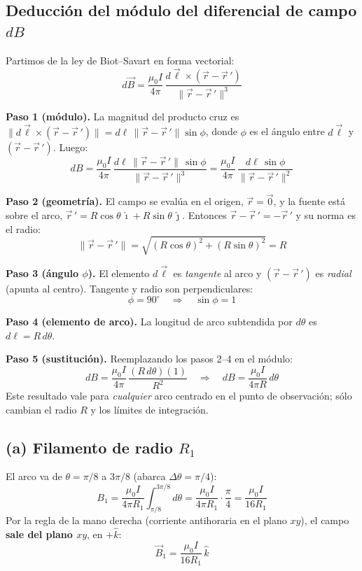 \documentclass[12pt,letterpaper]{article}
\begin{document}
\subsection*{Deducci\'on del m\'odulo del diferencial de campo $dB$}

Partimos de la ley de Biot--Savart en forma vectorial:
\[
    d\vec{B} = \frac{\mu_0 I}{4\pi}\,
    \frac{d\vec{\ell}\times(\vec{r}-\vec{r}\,')}{\|\vec{r}-\vec{r}\,'\|^{3}}
\]

\noindent\textbf{Paso 1 (m\'odulo).} La magnitud del producto cruz es
$\|d\vec{\ell}\times(\vec{r}-\vec{r}\,')\| = d\ell\,\|\vec{r}-\vec{r}\,'\|\sin\phi$, donde $\phi$ es el
\'angulo entre $d\vec{\ell}$ y $(\vec{r}-\vec{r}\,')$. Luego:
\[
    dB = \frac{\mu_0 I}{4\pi}\,
    \frac{d\ell\,\|\vec{r}-\vec{r}\,'\|\,\sin\phi}{\|\vec{r}-\vec{r}\,'\|^{3}}
    = \frac{\mu_0 I}{4\pi}\,\frac{d\ell\,\sin\phi}{\|\vec{r}-\vec{r}\,'\|^{2}}
\]

\noindent\textbf{Paso 2 (geometr\'ia).} El campo se eval\'ua en el origen, $\vec{r}=\vec{0}$, y la
fuente est\'a sobre el arco, $\vec{r}\,' = R\cos\theta\,\hat{\imath}+R\sin\theta\,\hat{\jmath}$.
Entonces $\vec{r}-\vec{r}\,'=-\vec{r}\,'$ y su norma es el radio:
\[
    \|\vec{r}-\vec{r}\,'\| = \sqrt{(R\cos\theta)^2+(R\sin\theta)^2} = R
\]

\noindent\textbf{Paso 3 (\'angulo $\phi$).} El elemento $d\vec{\ell}$ es \emph{tangente} al arco y
$(\vec{r}-\vec{r}\,')$ es \emph{radial} (apunta al centro). Tangente y radio son perpendiculares:
\[
    \phi = 90^\circ \quad\Rightarrow\quad \sin\phi = 1
\]

\noindent\textbf{Paso 4 (elemento de arco).} La longitud de arco subtendida por $d\theta$ es
$d\ell = R\,d\theta$.

\noindent\textbf{Paso 5 (sustituci\'on).} Reemplazando los pasos 2--4 en el m\'odulo:
\[
    dB = \frac{\mu_0 I}{4\pi}\,\frac{(R\,d\theta)(1)}{R^{2}}
    \quad\Rightarrow\quad
    \boxed{dB = \frac{\mu_0 I}{4\pi R}\,d\theta}
\]
Este resultado vale para \emph{cualquier} arco centrado en el punto de observaci\'on; s\'olo cambian
el radio $R$ y los l\'imites de integraci\'on.

\subsection*{(a) Filamento de radio $R_1$}

El arco va de $\theta=\pi/8$ a $3\pi/8$ (abarca $\Delta\theta=\pi/4$):
\[
    B_1 = \frac{\mu_0 I}{4\pi R_1}\int_{\pi/8}^{3\pi/8}\! d\theta
        = \frac{\mu_0 I}{4\pi R_1}\cdot\frac{\pi}{4} = \frac{\mu_0 I}{16 R_1}
\]
Por la regla de la mano derecha (corriente antihoraria en el plano $xy$), el campo \textbf{sale del
plano $xy$}, en $+\hat{k}$:
\[
    \boxed{\vec{B}_1 = \frac{\mu_0 I}{16 R_1}\,\hat{k}}
\]
\end{document}
